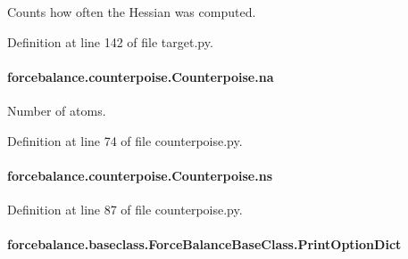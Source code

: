 Counts how often the Hessian was computed. 



Definition at line 142 of file target.\-py.

\hypertarget{classforcebalance_1_1counterpoise_1_1Counterpoise_a4b7699f3f3b2bd34aaa3fe8374c2ff69}{
\paragraph[{na}]{\setlength{\rightskip}{0pt plus 5cm}forcebalance.\-counterpoise.\-Counterpoise.\-na}}\label{classforcebalance_1_1counterpoise_1_1Counterpoise_a4b7699f3f3b2bd34aaa3fe8374c2ff69}


Number of atoms. 



Definition at line 74 of file counterpoise.\-py.

\hypertarget{classforcebalance_1_1counterpoise_1_1Counterpoise_a2a8334eaf74299344a1cf53be98f150b}{
\paragraph[{ns}]{\setlength{\rightskip}{0pt plus 5cm}forcebalance.\-counterpoise.\-Counterpoise.\-ns}}\label{classforcebalance_1_1counterpoise_1_1Counterpoise_a2a8334eaf74299344a1cf53be98f150b}


Definition at line 87 of file counterpoise.\-py.

\hypertarget{classforcebalance_1_1baseclass_1_1ForceBalanceBaseClass_a5c55e661e746d1a4443f4e0bc34ebe05}{
\paragraph[{Print\-Option\-Dict}]{\setlength{\rightskip}{0pt plus 5cm}forcebalance.\-baseclass.\-Force\-Balance\-Base\-Class.\-Print\-Option\-Dict\hspace{0.3cm}{\ttfamily [inherited]}}}\label{classforcebalance_1_1baseclass_1_1ForceBalanceBaseClass_a5c55e661e746d1a4443f4e0bc34ebe05}


